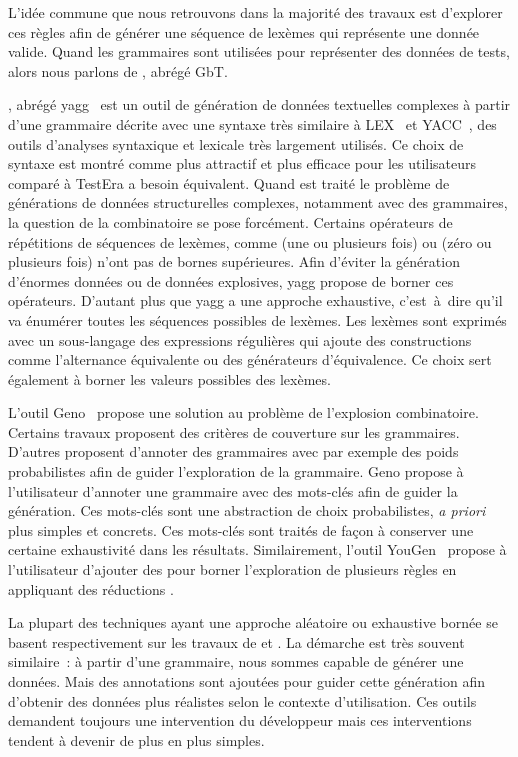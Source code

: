 L'idée commune que nous retrouvons dans la majorité des travaux est d'explorer
ces règles afin de générer une {\strong séquence de lexèmes} qui représente une
donnée valide. Quand les grammaires sont utilisées pour représenter des données
de tests, alors nous parlons de , abrégé GbT.

, abrégé yagg~ est
un outil de génération de données textuelles complexes à partir d'une grammaire
décrite avec une syntaxe très similaire à LEX~ et
YACC~, des outils d'analyses syntaxique et lexicale très
largement utilisés. Ce choix de syntaxe est montré comme plus attractif et plus
efficace pour les utilisateurs comparé à TestEra a besoin équivalent. Quand est
traité le problème de générations de données structurelles complexes, notamment
avec des grammaires, la question de la combinatoire se pose forcément. Certains
opérateurs de répétitions de séquences de lexèmes, comme \code{+} (une ou
plusieurs fois) ou \code{*} (zéro ou plusieurs fois) n'ont pas de bornes
supérieures. Afin d'éviter la génération d'énormes données ou de données
explosives, yagg propose de borner ces opérateurs. D'autant plus que yagg a une
approche exhaustive, c'est~à~dire qu'il va énumérer toutes les séquences
possibles de lexèmes.  Les lexèmes sont exprimés avec un sous-langage des
expressions régulières qui ajoute des constructions comme l'alternance
équivalente ou des générateurs d'équivalence.  Ce choix sert également à borner
les valeurs possibles des lexèmes.

L'outil Geno~ propose une solution au problème de l'explosion
combinatoire. Certains travaux proposent des critères de couverture sur les
grammaires. D'autres proposent d'annoter des grammaires avec par exemple des
poids probabilistes afin de guider l'exploration de la grammaire. Geno propose à
l'utilisateur d'annoter une grammaire avec des mots-clés afin de guider la
génération. Ces mots-clés sont une abstraction de choix probabilistes, {\em a
priori} plus simples et concrets. Ces mots-clés sont traités de façon à
conserver une certaine exhaustivité dans les résultats. Similairement, l'outil
YouGen~ propose à l'utilisateur d'ajouter des
 pour borner l'exploration de plusieurs règles en appliquant des
réductions .

La plupart des techniques ayant une approche aléatoire ou exhaustive bornée se
basent respectivement sur les travaux de  et
. La démarche est très souvent similaire~: à partir d'une
grammaire, nous sommes capable de générer une données. Mais des annotations sont
ajoutées pour guider cette génération afin d'obtenir des données plus réalistes
selon le contexte d'utilisation. Ces outils demandent toujours une intervention
du développeur mais ces interventions tendent à devenir de plus en plus simples.

